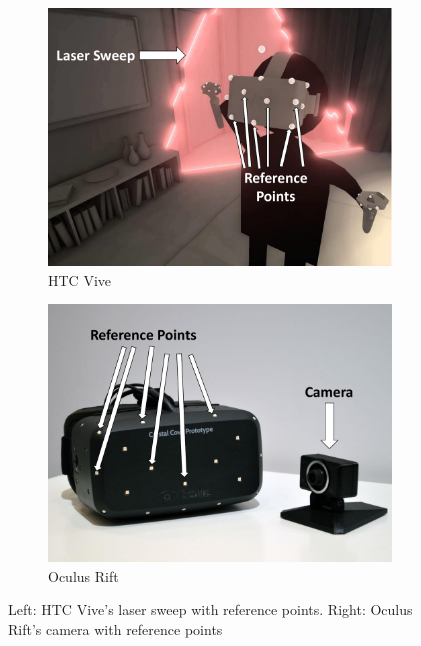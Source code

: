 \documentclass[journal]{IEEEtran}
\begin{document}
\begin{figure}
	\hspace{-10 ex}
	\begin{subfigure}{.3\textwidth}
		\centering
		\includegraphics[width=.9\linewidth]{vive}
		\caption{HTC Vive\cite{vive_image}}
		\label{fig:vive}
	\end{subfigure}%
	\begin{subfigure}{.3\textwidth}
		\centering
		\includegraphics[width=.9\linewidth]{oculus}
		\caption{Oculus Rift\cite{oculus_image}}
		\label{fig:oculus}
	\end{subfigure}
	\caption{Left: HTC Vive's laser sweep with reference points. Right: Oculus Rift's camera with reference points}
	\label{fig:Vive and Oculus}
\end{figure}
\end{document}
